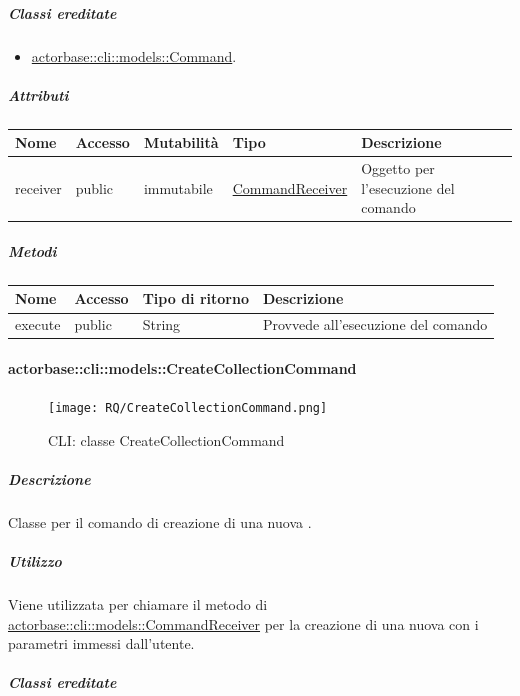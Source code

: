 \documentclass{scalatekids-article}
\begin{document}
\subparagraph{Classi ereditate}

\begin{itemize}
\item \hyperref[sec:actorbase::cli::models::Command]{actorbase::cli::models::Command}.
\end{itemize}

\subparagraph{Attributi}

\begin{tabular}{| p{1cm} | p{1.5cm} | p{2cm} | p{4cm} | p{8.5cm} |}
  \hline
  Nome & Accesso & Mutabilità & Tipo & Descrizione\\
  \hline
  receiver & public & immutabile & \hyperref[sec:actorbase::cli::models::CommandReceiver]{CommandReceiver} & Oggetto per l'esecuzione del comando\\
  \hline
\end{tabular}

\subparagraph{Metodi}

\begin{tabular}{| l | l | l | l |}
  \hline
  Nome & Accesso & Tipo di ritorno & Descrizione\\
  \hline
  execute & public & String & Provvede all'esecuzione del comando\\
  \hline
\end{tabular}

\paragraph{actorbase::cli::models::CreateCollectionCommand}
\label{sec:actorbase::cli::models::CreateCollectionCommand}

\begin{figure}[H]
  \begin{center}
    \texttt{[image: RQ/CreateCollectionCommand.png]}
    \caption{CLI: classe CreateCollectionCommand}
  \end{center}
\end{figure}

\subparagraph{Descrizione}

Classe per il comando di creazione di una nuova .

\subparagraph{Utilizzo}

Viene utilizzata per chiamare il metodo di
\hyperref[sec:actorbase::cli::models::CommandReceiver]{actorbase::cli::models::CommandReceiver} per la creazione di una nuova
 con i parametri immessi dall'utente.

\subparagraph{Classi ereditate}
\end{document}
